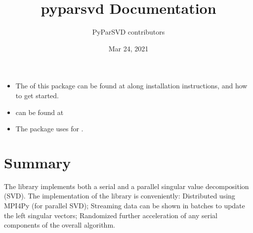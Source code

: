 \documentclass[letterpaper,10pt,english]{sphinxmanual}
\title{pyparsvd Documentation}
\date{Mar 24, 2021}
\author{PyParSVD contributors}
\begin{document}
\pagestyle{empty}
\sphinxmaketitle
\pagestyle{plain}
\sphinxtableofcontents
\pagestyle{normal}
\label{\detokenize{index::doc}}

\begin{itemize}
\item {} 
\sphinxAtStartPar
The  of this package can be found at  along installation instructions, and how to get started.

\item {} 
\sphinxAtStartPar
{} can be found at 

\item {} 
\sphinxAtStartPar
The package uses  for .

\end{itemize}


\chapter{Summary}
\label{\detokenize{index:summary}}
\sphinxAtStartPar
The  library implements both a serial and a parallel singular value decomposition (SVD).
The implementation of the library is conveniently:
\sphinxhyphen{} Distributed using MPI4Py (for parallel SVD);
\sphinxhyphen{} Streaming \sphinxhyphen{} data can be shown in batches to update the left singular vectors;
\sphinxhyphen{} Randomized \sphinxhyphen{} further acceleration of any serial components of the overall algorithm.
\end{document}
